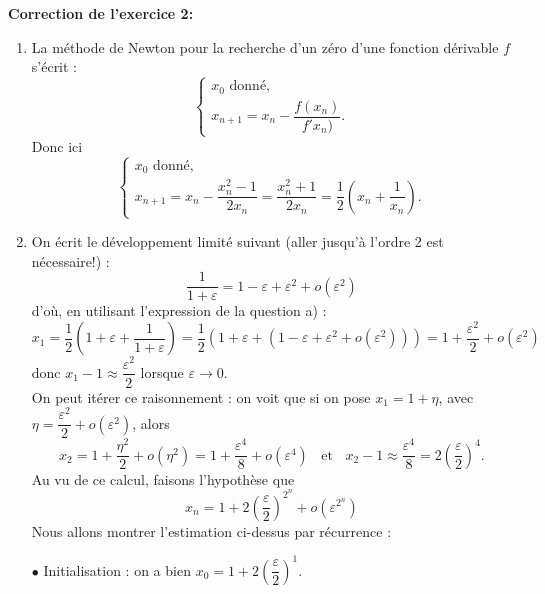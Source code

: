 \documentclass[11pt,a4paper]{article}
\begin{document}
{\bf Correction de l'exercice 2:} \vspace{0.1cm}\\
\begin{enumerate}
\item La méthode de Newton pour la recherche d'un zéro d'une fonction dérivable $f$ s'écrit :
$$
\left\{
\begin{array}{l}
x_0 \mbox{ donné,}\\
x_{n+1} = x_n -\dfrac{f(x_n)}{f'{x_n)}}.
\end{array}
\right.
$$
Donc ici
$$
\left\{
\begin{array}{l}
x_0 \mbox{ donné,}\\
x_{n+1} = x_n -\dfrac{x_n^2-1}{2x_n} = \dfrac{x_n^2+1}{2x_n} = \dfrac{1}{2}\left(x_n + \dfrac{1}{x_n}\right).
\end{array}
\right.
$$
\item On écrit le développement limité suivant (aller jusqu'à l'ordre 2 est nécessaire!) :
$$
\dfrac{1}{1+\varepsilon} = 1-\varepsilon+\varepsilon^2 + o(\varepsilon^2)
$$
d'où, en utilisant l'expression de la question a) :
$$
x_1 = \dfrac{1}{2}\left(1+\varepsilon + \dfrac{1}{1+\varepsilon}\right) = \dfrac{1}{2}\left(1+\varepsilon + (1-\varepsilon+\varepsilon^2 + o(\varepsilon^2))\right) = 1 + \dfrac{\varepsilon^2}{2} + o(\varepsilon^2)
$$
donc $x_1-1 \approx \dfrac{\varepsilon^2}{2}$ lorsque $\varepsilon \to 0$.
\\
On peut itérer ce raisonnement : 
on voit que si on pose $x_1 = 1+\eta$, avec $\eta = \dfrac{\varepsilon^2}{2}+o(\varepsilon^2)$, alors 
$$x_2 = 1 + \dfrac{\eta^2}{2} + o(\eta^2) = 1 + \dfrac{\varepsilon^4}{8} + o(\varepsilon^4) \;\; \mbox{ et }\;\; x_2-1\approx\dfrac{\varepsilon^4}{8}= 2\left(\dfrac{\varepsilon}{2}\right)^4.$$
Au vu de ce calcul, faisons l'hypothèse que
$$
x_n = 1 + 2\left(\dfrac{\varepsilon}{2}\right)^{2^n} + o(\varepsilon^{2^n})
$$
Nous allons montrer l'estimation ci-dessus par récurrence : 

$\bullet$ Initialisation : on a bien $x_0 =1+ 2\left(\dfrac{\varepsilon}{2}\right)^{1}$. 


\end{enumerate}
\end{document}
